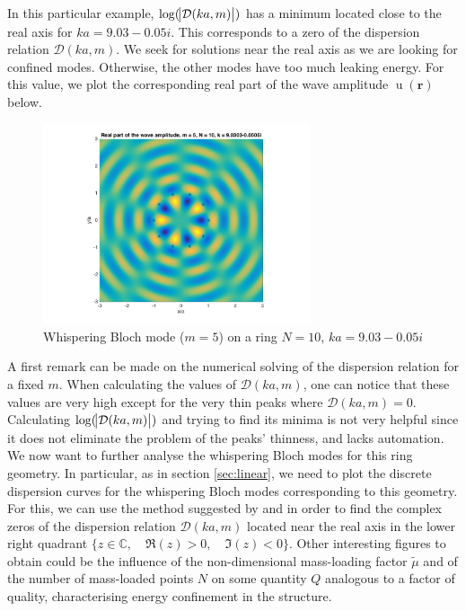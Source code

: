 \documentclass[11pt]{report}
\numberwithin{equation}{section}
\begin{document}
%
\noindent
In this particular example, $\log(\abs{\mathcal{D}(k a,m)})$ has a minimum located close to the real axis for $k a = 9.03 - 0.05i$. This corresponds to a zero of the dispersion relation $\mathcal{D}(k a,m)$. We seek for solutions near the real axis as we are looking for confined modes. Otherwise, the other modes have too much leaking energy. For this value, we plot the corresponding real part of the wave amplitude $\operatorname{u}(\bm{r})$ below.
%
\begin{figure} [H]
    \centering
    \includegraphics[width = 0.7\textwidth]{RB10_5}
    \caption{Whispering Bloch mode ($m=5$) on a ring $N=10$, $k a = 9.03 - 0.05i$ }
    \label{fig:my_label}
\end{figure}
%
\noindent
A first remark can be made on the numerical solving of the dispersion  relation for a fixed $m$. When calculating the values of $\mathcal{D}(k a,m)$, one can notice that these values are very high except for the very thin peaks where $\mathcal{D}(k a,m)=0$. Calculating $\log(\abs{\mathcal{D}(k a,m)})$ and trying to find its minima is not very helpful since it does not eliminate the problem of the peaks' thinness, and lacks automation. We now want to further analyse the whispering Bloch modes for this ring geometry. In particular, as in section \ref{sec:linear}, we need to plot the discrete dispersion curves for the whispering Bloch modes corresponding to this geometry. For this, we can use the method suggested by \cite{delves1967numerical} and \cite{brazier1991} in order to find the complex zeros of the dispersion relation $\mathcal{D}(k a,m)$ located near the real axis in the lower right quadrant $\{z \in \mathbb{C}, \quad \Re(z)>0, \quad \Im(z)<0 \}$. Other interesting figures to obtain could be the influence of the non-dimensional mass-loading factor $\tilde{\mu}$ and of the number of mass-loaded points $N$ on some quantity $Q$ analogous to a factor of quality, characterising energy confinement in the structure.
\end{document}
